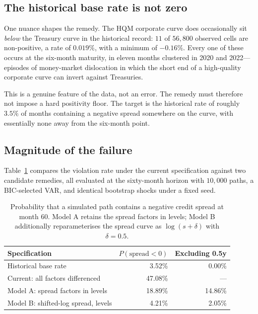 \documentclass[11pt,a4paper]{article}
\begin{document}
\subsection{The historical base rate is not zero}

One nuance shapes the remedy. The HQM corporate curve does occasionally sit
\emph{below} the Treasury curve in the historical record: $11$ of $56{,}800$
observed cells are non-positive, a rate of $0.019\%$, with a minimum of
$-0.16\%$. Every one of these occurs at the six-month maturity, in eleven months
clustered in 2020 and 2022---episodes of money-market dislocation in which the
short end of a high-quality corporate curve can invert against Treasuries.

This is a genuine feature of the data, not an error. The remedy must therefore
not impose a hard positivity floor. The target is the historical rate of roughly
$3.5\%$ of months containing a negative spread somewhere on the curve, with
essentially none away from the six-month point.

\subsection{Magnitude of the failure}

Table~\ref{tab:coherence} compares the violation rate under the current
specification against two candidate remedies, all evaluated at the sixty-month
horizon with $10{,}000$ paths, a BIC-selected VAR, and identical bootstrap
shocks under a fixed seed.

\begin{table}[htbp]
\centering
\caption{Probability that a simulated path contains a negative credit spread at
month 60. Model A retains the spread factors in levels; Model B additionally
reparameterises the spread curve as $\log(s + \delta)$ with $\delta = 0.5$.}
\label{tab:coherence}
\begin{tabular}{lrr}
\toprule
Specification & $P(\text{spread} < 0)$ & Excluding 0.5y \\
\midrule
Historical base rate                  & 3.52\%  & 0.00\% \\
\midrule
Current: all factors differenced      & 47.08\% & --- \\
Model A: spread factors in levels     & 18.89\% & 14.86\% \\
Model B: shifted-log spread, levels   & 4.21\%  & 2.05\% \\
\bottomrule
\end{tabular}
\end{table}
\end{document}
